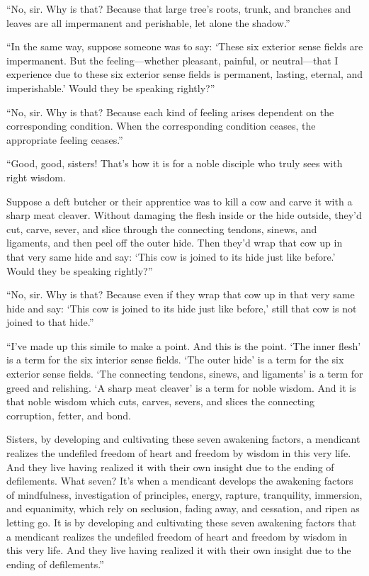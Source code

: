 \documentclass[12pt,openany]{book}%
\begin{document}
“No, sir. Why is that? Because that large tree’s roots, trunk, and branches and leaves are all impermanent and perishable, let alone the shadow.” 

“In the same way, suppose someone was to say: ‘These six exterior sense fields are impermanent. But the feeling—whether pleasant, painful, or neutral—that I experience due to these six exterior sense fields is permanent, lasting, eternal, and imperishable.’ Would they be speaking rightly?” 

“No, sir. Why is that? Because each kind of feeling arises dependent on the corresponding condition. When the corresponding condition ceases, the appropriate feeling ceases.” 

“Good, good, sisters! That’s how it is for a noble disciple who truly sees with right wisdom. 

Suppose a deft butcher or their apprentice was to kill a cow and carve it with a sharp meat cleaver. Without damaging the flesh inside or the hide outside, they’d cut, carve, sever, and slice through the connecting tendons, sinews, and ligaments, and then peel off the outer hide. Then they’d wrap that cow up in that very same hide and say: ‘This cow is joined to its hide just like before.’ Would they be speaking rightly?” 

“No, sir. Why is that? Because even if they wrap that cow up in that very same hide and say: ‘This cow is joined to its hide just like before,’ still that cow is not joined to that hide.” 

“I’ve made up this simile to make a point. And this is the point. ‘The inner flesh’ is a term for the six interior sense fields. ‘The outer hide’ is a term for the six exterior sense fields. ‘The connecting tendons, sinews, and ligaments’ is a term for greed and relishing. ‘A sharp meat cleaver’ is a term for noble wisdom. And it is that noble wisdom which cuts, carves, severs, and slices the connecting corruption, fetter, and bond. 

Sisters, by developing and cultivating these seven awakening factors, a mendicant realizes the undefiled freedom of heart and freedom by wisdom in this very life. And they live having realized it with their own insight due to the ending of defilements. What seven? It’s when a mendicant develops the awakening factors of mindfulness, investigation of principles, energy, rapture, tranquility, immersion, and equanimity, which rely on seclusion, fading away, and cessation, and ripen as letting go. It is by developing and cultivating these seven awakening factors that a mendicant realizes the undefiled freedom of heart and freedom by wisdom in this very life. And they live having realized it with their own insight due to the ending of defilements.” 
\end{document}
